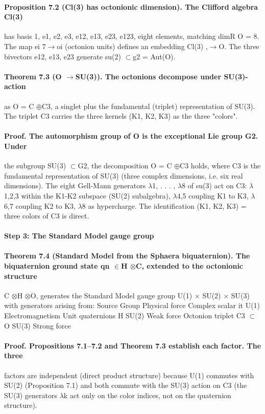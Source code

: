 \documentclass[12pt,a4paper]{article}
\begin{document}
\paragraph*{Proposition 7.2 (Cl(3) has octonionic dimension). The Clifford algebra Cl(3)}
has basis {1, e1, e2, e3, e12, e13, e23, e123}, eight elements, matching dimR O = 8. The map ei 7$\to$oi (octonion units) defines an embedding Cl(3) ,$\to$O. The three bivectors e12, e13, e23 generate su(2) $\subset$g2 = Aut(O).
\paragraph*{Theorem 7.3 (O $\to$SU(3)). The octonions decompose under SU(3)-action}
as O = C $\oplus$C3,
a singlet plus the fundamental (triplet) representation of SU(3). The triplet C3 carries the three kernels (K1, K2, K3) as the three "colors".
\paragraph*{Proof. The automorphism group of O is the exceptional Lie group G2. Under}
the subgroup SU(3) $\subset$G2, the decomposition O = C $\oplus$C3 holds, where C3 is the fundamental representation of SU(3) (three complex dimensions, i.e. six real dimensions). The eight Gell-Mann generators $\lambda$1, . . . , $\lambda$8 of su(3) act on C3: $\lambda$1,2,3 within the K1-K2 subspace (SU(2) subalgebra), $\lambda$4,5 coupling K1 to K3, $\lambda$6,7 coupling K2 to K3, $\lambda$8 as hypercharge. The identification (K1, K2, K3) = three colors of C3 is direct.
\paragraph*{Step 3: The Standard Model gauge group}
\paragraph*{Theorem 7.4 (Standard Model from the Sphaera biquaternion). The biquaternion ground state qn $\in$H $\otimes$C, extended to the octonionic structure}
C $\otimes$H $\otimes$O, generates the Standard Model gauge group U(1) $\times$ SU(2) $\times$ SU(3) with generators arising from: Source Group Physical force Complex scalar it U(1) Electromagnetism Unit quaternions H SU(2) Weak force Octonion triplet C3 $\subset$O SU(3) Strong force
\paragraph*{Proof. Propositions 7.1--7.2 and Theorem 7.3 establish each factor. The three}
factors are independent (direct product structure) because U(1) commutes with SU(2) (Proposition 7.1) and both commute with the SU(3) action on C3 (the SU(3) generators $\lambda$k act only on the color indices, not on the quaternion structure).
\end{document}
